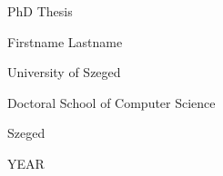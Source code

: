 \documentclass[a4paper,12pt]{article}
\begin{document}
	
\begin{center}
	
	
	\vspace*{6em}

	{\Huge PhD Thesis}
	
	\vfill
	
	{\LARGE Firstname Lastname} %
	
	\vspace*{6em}
	
	{\Large University of Szeged}
	
	{\Large Doctoral School of Computer Science}
	
	\vfill
	
	\vspace*{4em}
	
	{\Large Szeged}
	
	{\Large YEAR} %
\end{center}
	
\end{document}
